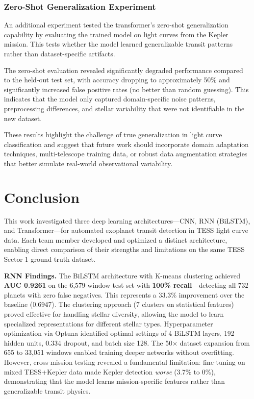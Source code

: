 \documentclass[letterpaper]{article} %
\begin{document}
\subsubsection*{Zero-Shot Generalization Experiment}

An additional experiment tested the transformer's zero-shot generalization capability by evaluating the trained model on light curves from the Kepler mission. This tests whether the model learned generalizable transit patterns rather than dataset-specific artifacts.

The zero-shot evaluation revealed significantly degraded performance compared to the held-out test set, with accuracy dropping to approximately 50\% and significantly increased false positive rates (no better than random guessing). This indicates that the model only captured domain-specific noise patterns, preprocessing differences, and stellar variability that were not identifiable in the new dataset.

These results highlight the challenge of true generalization in light curve classification and suggest that future work should incorporate domain adaptation techniques, multi-telescope training data, or robust data augmentation strategies that better simulate real-world observational variability.


\section*{Conclusion}

This work investigated three deep learning architectures---CNN, RNN (BiLSTM), and Transformer---for automated exoplanet transit detection in TESS light curve data. Each team member developed and optimized a distinct architecture, enabling direct comparison of their strengths and limitations on the same TESS Sector 1 ground truth dataset.

\textbf{RNN Findings.} The BiLSTM architecture with K-means clustering achieved \textbf{AUC 0.9261} on the 6,579-window test set with \textbf{100\% recall}---detecting all 732 planets with zero false negatives. This represents a 33.3\% improvement over the baseline (0.6947). The clustering approach (7 clusters on statistical features) proved effective for handling stellar diversity, allowing the model to learn specialized representations for different stellar types. Hyperparameter optimization via Optuna identified optimal settings of 4 BiLSTM layers, 192 hidden units, 0.334 dropout, and batch size 128. The 50$\times$ dataset expansion from 655 to 33,051 windows enabled training deeper networks without overfitting. However, cross-mission testing revealed a fundamental limitation: fine-tuning on mixed TESS+Kepler data made Kepler detection \textit{worse} (3.7\% to 0\%), demonstrating that the model learns mission-specific features rather than generalizable transit physics.
\end{document}
